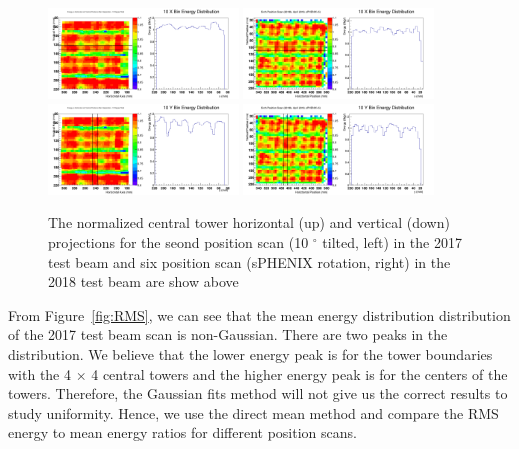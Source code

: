 \documentclass[hidelinks,11pt]{article}
\numberwithin{figure}{section}
\numberwithin{table}{section}
\newcommand{\degree}{\mbox{$^\circ$}\xspace}
\begin{document}
\begin{figure}[hbtp]
\begin{center}
\includegraphics[width=0.45\textwidth]{Plots/2017/2nd/CombY5.png}
\includegraphics[width=0.45\textwidth]{Plots/2018/6th/CombY7.png}
\includegraphics[width=0.45\textwidth]{Plots/2017/2nd/CombX3.png}
\includegraphics[width=0.45\textwidth]{Plots/2018/6th/CombX6.png}
\caption{The normalized central tower horizontal (up) and vertical (down) projections for the seond position scan (10 \degree tilted, left) in the 2017 test beam and six position scan (sPHENIX rotation, right) in the 2018 test beam are show above}
\label{fig:sPHENIXhv}
\end{center}
\end{figure} 


From Figure~\ref{fig:RMS}, we can see that the mean energy distribution distribution of the 2017 test beam scan is non-Gaussian. There are two peaks in the distribution. We believe that the lower energy peak is for the tower boundaries with the 4 $\times$ 4 central towers and the higher energy peak is for the centers of the towers. Therefore, the Gaussian fits method will not give us the correct results to study uniformity. Hence, we use the direct mean method and compare the RMS energy to mean energy ratios for different position scans. 
\end{document}
